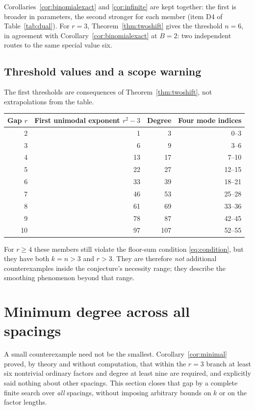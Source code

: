 \documentclass[11pt]{article}
\theoremstyle{research}
\theoremstyle{definition}
\numberwithin{equation}{section}
\begin{document}
Corollaries~\ref{cor:binomialexact} and \ref{cor:infinite} are kept
together: the first is broader in parameters, the second stronger for each
member (item D4 of Table~\ref{tab:dual}).
For $r=3$, Theorem~\ref{thm:twoshift} gives the threshold $n=6$, in
agreement with Corollary~\ref{cor:binomialexact} at $B=2$: two independent
routes to the same special value six.

\subsection{Threshold values and a scope warning}
The first thresholds are consequences of Theorem~\ref{thm:twoshift}, not
extrapolations from the table.
\begin{center}
\small
\begin{tabular}{rrrr}
\toprule
Gap $r$ & First unimodal exponent $r^2-3$ & Degree & Four mode indices\\
\midrule
2&1&3&0--3\\
3&6&9&3--6\\
4&13&17&7--10\\
5&22&27&12--15\\
6&33&39&18--21\\
7&46&53&25--28\\
8&61&69&33--36\\
9&78&87&42--45\\
10&97&107&52--55\\
\bottomrule
\end{tabular}
\end{center}
For $r\ge4$ these members still violate the floor-sum condition
\eqref{eq:condition}, but they have both $k=n>3$ and $r>3$. They are
therefore \emph{not} additional counterexamples inside the conjecture's
necessity range; they describe the smoothing phenomenon beyond that range.

\section{Minimum degree across all spacings}
\label{sec:minimal}
A small counterexample need not be the smallest.
Corollary~\ref{cor:minimal} proved, by theory and without computation,
that within the $r=3$ branch at least six nontrivial ordinary factors and
degree at least nine are required, and explicitly said nothing about other
spacings. This section closes that gap by a complete finite search over
\emph{all} spacings, without imposing arbitrary bounds on $k$ or on the
factor lengths.
\end{document}
